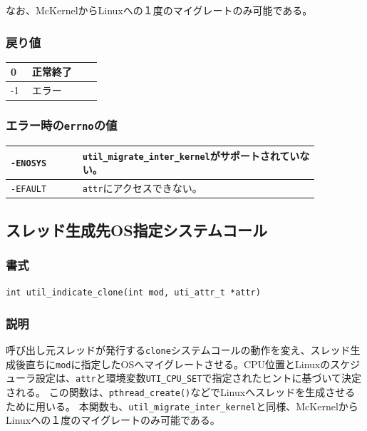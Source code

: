 \documentclass[twoside,11pt,fleqn]{book}
\begin{document}
なお、McKernelからLinuxへの１度のマイグレートのみ可能である。
 
\subsubsection*{戻り値}{\quad}
\begin{table}[!ht]
\footnotesize
\begin{tabular}{|p{0.20\linewidth}|p{0.66\linewidth}|} \hline
0&正常終了\\ \hline
-1&エラー\\ \hline
\end{tabular}
\vspace{-0em}
\end{table}
\FloatBarrier

\subsubsection*{エラー時の\texttt{errno}の値}{\quad}
\begin{table}[!ht]
\footnotesize
\begin{tabular}{|p{0.20\linewidth}|p{0.66\linewidth}|} \hline
\texttt{-ENOSYS}&\texttt{util\_migrate\_inter\_kernel}がサポートされていない。\\ \hline
\texttt{-EFAULT}&\texttt{attr}にアクセスできない。\\ \hline
\end{tabular}
\vspace{-0em}
\end{table}
\FloatBarrier


\subsection{スレッド生成先OS指定システムコール}
\subsubsection*{書式}{\quad} \texttt{int util\_indicate\_clone(int mod, uti\_attr\_t *attr)}
\subsubsection*{説明}{\quad}
呼び出し元スレッドが発行する\texttt{clone}システムコールの動作を変え、スレッド生成後直ちに\texttt{mod}に指定したOSへマイグレートさせる。CPU位置とLinuxのスケジューラ設定は、\texttt{attr}と環境変数\texttt{UTI\_CPU\_SET}で指定されたヒントに基づいて決定される。
この関数は、\texttt{pthread\_create()}などでLinuxへスレッドを生成させるために用いる。
本関数も、\texttt{util\_migrate\_inter\_kernel}と同様、McKernelからLinuxへの１度のマイグレートのみ可能である。
\end{document}
